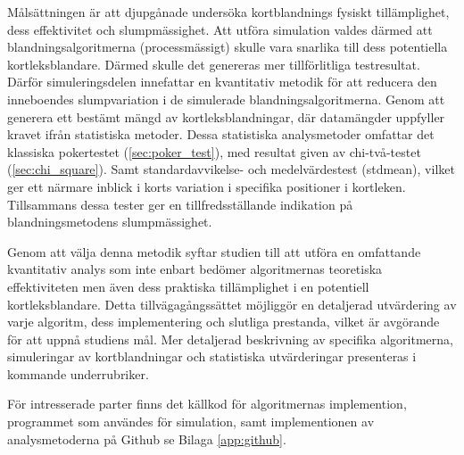 \documentclass[swedish,a4paper]{article}
\begin{document}
Målsättningen är att djupgånade undersöka kortblandnings
fysiskt tillämplighet, dess effektivitet och slumpmässighet. Att utföra 
simulation valdes därmed att blandningsalgoritmerna
(processmässigt) skulle vara snarlika till dess potentiella kortleks\-blandare.
Därmed skulle det genereras mer tillförlitliga testresultat. Därför simuleringsdelen
innefattar en kvantitativ metodik för att reducera den inneboendes
slumpvariation i de simulerade blandningsalgoritmerna. Genom att generera ett bestämt
mängd av kortleksblandningar, där datamängder uppfyller kravet ifrån statistiska metoder. Dessa
statistiska  analysmetoder omfattar det klassiska pokertestet (\ref{sec:poker_test}), med
resultat given av chi-två-testet (\ref{sec:chi_square}). Samt standardavvikelse- och medelvärdestest (\gls{stdmean}), vilket ger ett närmare inblick i korts variation i specifika
positioner i kortleken. Tillsammans dessa tester ger en tillfredsställande indikation på
blandningsmetodens slumpmässighet. 

Genom att välja denna metodik syftar studien till att utföra en omfattande
kvantitativ analys som inte enbart bedömer algoritmernas teoretiska
effektiviteten men även dess praktiska tillämplighet i en potentiell kortleks\-blandare.
Detta tillvägagångssättet möjliggör en detaljerad utvärdering av varje algoritm,
dess implementering och slutliga prestanda, vilket är avgörande för att uppnå
studiens mål. Mer detaljerad beskrivning av specifika algoritmerna,
simuleringar av kortblandningar och statistiska utvärderingar presenteras i kommande 
underrubriker. 

För intresserade parter finns det källkod för algoritmernas implemention,
programmet som användes för simulation, samt implementionen av analysmetoderna
på Github se Bilaga \ref{app:github}.

%
%
\end{document}
